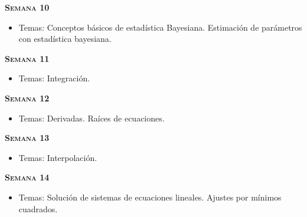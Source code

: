 \documentclass[letterpaper,10pt,onecolumn]{article}
\begin{document}
\noindent\textbf{\textsc{Semana 10}}\\[-0.5cm]
\begin{itemize}
\item Temas: Conceptos b\'asicos de estad\'istica Bayesiana. Estimaci\'on de par\'ametros con estad\'istica bayesiana. \\[-0.6cm]  
\end{itemize}


\noindent\textbf{\textsc{Semana 11}}\\[-0.5cm]
\begin{itemize}
\item Temas: Integraci\'on. \\[-0.6cm]
\end{itemize}

\noindent\textbf{\textsc{Semana 12}}\\[-0.5cm]
\begin{itemize}
\item Temas: Derivadas. Ra\'ices de ecuaciones. \\[-0.6cm]
\end{itemize}

\noindent\textbf{\textsc{Semana 13}}\\[-0.5cm]
\begin{itemize}
\item Temas: Interpolación. \\[-0.6cm]
\end{itemize}

\noindent\textbf{\textsc{Semana 14}}\\[-0.5cm]
\begin{itemize}
\item Temas: Soluci\'on de sistemas de ecuaciones lineales. Ajustes
  por m\'inimos cuadrados. \\[-0.6cm] 
\end{itemize}
\end{document}
